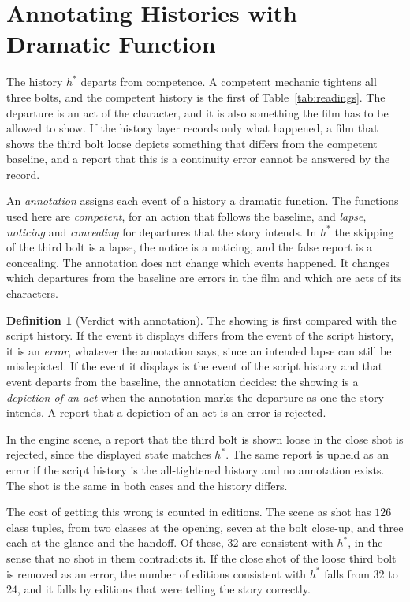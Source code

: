 \documentclass[11pt,twoside,openright]{book}
\theoremstyle{plain}
\theoremstyle{definition}
\newtheorem{definition}[theorem]{Definition}
\theoremstyle{remark}
\begin{document}
\section{Annotating Histories with Dramatic Function}\label{sec:annotate}

The history $h^\ast$ departs from competence. A competent mechanic tightens all three bolts, and the competent history is the first of Table~\ref{tab:readings}. The departure is an act of the character, and it is also something the film has to be allowed to show. If the history layer records only what happened, a film that shows the third bolt loose depicts something that differs from the competent baseline, and a report that this is a continuity error cannot be answered by the record.

An \emph{annotation} assigns each event of a history a dramatic function. The functions used here are \emph{competent}, for an action that follows the baseline, and \emph{lapse}, \emph{noticing} and \emph{concealing} for departures that the story intends. In $h^\ast$ the skipping of the third bolt is a lapse, the notice is a noticing, and the false report is a concealing. The annotation does not change which events happened. It changes which departures from the baseline are errors in the film and which are acts of its characters.

\begin{definition}[Verdict with annotation]\label{def:annverdict}
The showing is first compared with the script history. If the event it displays differs from the event of the script history, it is an \emph{error}, whatever the annotation says, since an intended lapse can still be misdepicted. If the event it displays is the event of the script history and that event departs from the baseline, the annotation decides: the showing is a \emph{depiction of an act} when the annotation marks the departure as one the story intends. A report that a depiction of an act is an error is rejected.
\end{definition}

In the engine scene, a report that the third bolt is shown loose in the close shot is rejected, since the displayed state matches $h^\ast$. The same report is upheld as an error if the script history is the all-tightened history and no annotation exists. The shot is the same in both cases and the history differs.

The cost of getting this wrong is counted in editions. The scene as shot has $126$ class tuples, from two classes at the opening, seven at the bolt close-up, and three each at the glance and the handoff. Of these, $32$ are consistent with $h^\ast$, in the sense that no shot in them contradicts it. If the close shot of the loose third bolt is removed as an error, the number of editions consistent with $h^\ast$ falls from $32$ to $24$, and it falls by editions that were telling the story correctly.
\end{document}
